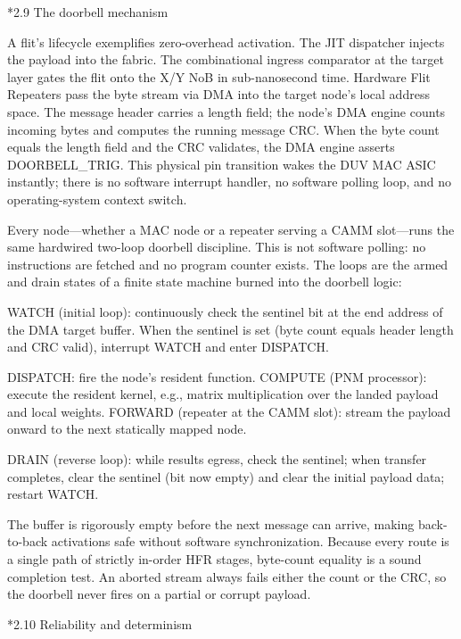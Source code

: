 \documentclass[12pt]{article}
\makeatletter
\renewcommand\subsection{\@startsection{subsection}{2}{\z@}{-1.0ex \@plus -0.2ex}{0.3ex}{\normalsize\bfseries}}
\makeatother
\begin{document}
\subsection*{2.9 The doorbell mechanism}

A flit's lifecycle exemplifies zero-overhead activation. The JIT dispatcher injects the payload into the fabric. The combinational ingress comparator at the target layer gates the flit onto the X/Y NoB in sub-nanosecond time. Hardware Flit Repeaters pass the byte stream via DMA into the target node's local address space. The message header carries a length field; the node's DMA engine counts incoming bytes and computes the running message CRC. When the byte count equals the length field and the CRC validates, the DMA engine asserts DOORBELL\_TRIG. This physical pin transition wakes the DUV MAC ASIC instantly; there is no software interrupt handler, no software polling loop, and no operating-system context switch.

Every node---whether a MAC node or a repeater serving a CAMM slot---runs the same hardwired two-loop doorbell discipline. This is not software polling: no instructions are fetched and no program counter exists. The loops are the armed and drain states of a finite state machine burned into the doorbell logic:

WATCH (initial loop): continuously check the sentinel bit at the end address of the DMA target buffer. When the sentinel is set (byte count equals header length and CRC valid), interrupt WATCH and enter DISPATCH.

DISPATCH: fire the node's resident function. COMPUTE (PNM processor): execute the resident kernel, e.g., matrix multiplication over the landed payload and local weights. FORWARD (repeater at the CAMM slot): stream the payload onward to the next statically mapped node.

DRAIN (reverse loop): while results egress, check the sentinel; when transfer completes, clear the sentinel (bit now empty) and clear the initial payload data; restart WATCH.

The buffer is rigorously empty before the next message can arrive, making back-to-back activations safe without software synchronization. Because every route is a single path of strictly in-order HFR stages, byte-count equality is a sound completion test. An aborted stream always fails either the count or the CRC, so the doorbell never fires on a partial or corrupt payload.

\subsection*{2.10 Reliability and determinism}
\end{document}
